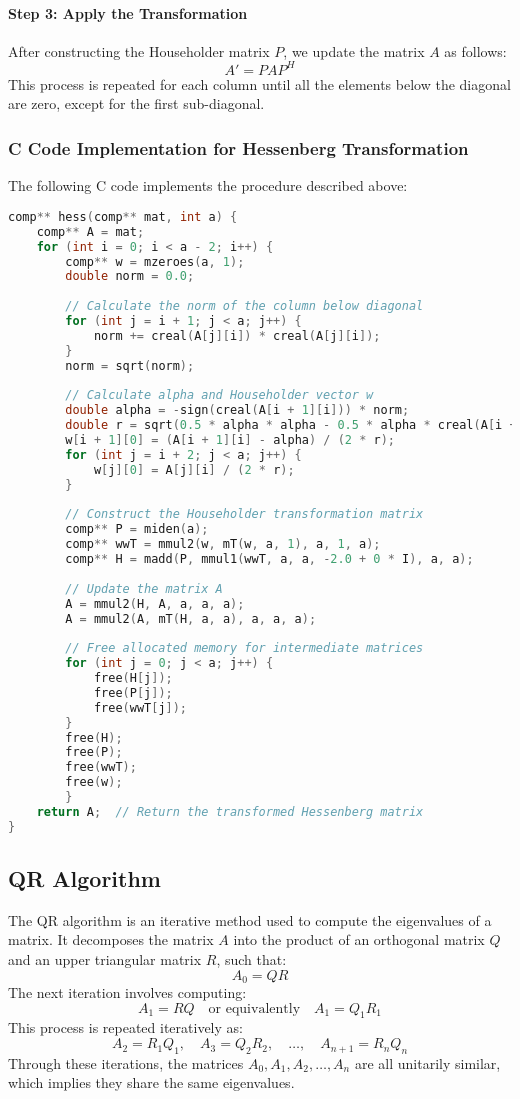 \documentclass[journal,12pt,onecolumn]{IEEEtran}
\theoremstyle{remark}
\begin{document}
\paragraph{Step 3: Apply the Transformation}

After constructing the Householder matrix \( P \), we update the matrix \( A \) as follows:
\[
A' = P A P^H
\]
This process is repeated for each column until all the elements below the diagonal are zero, except for the first sub-diagonal.\\
\newpage

\subsubsection*{C Code Implementation for Hessenberg Transformation}
	
	The following C code implements the procedure described above:
	
\begin{lstlisting}[language=C]
comp** hess(comp** mat, int a) {
	comp** A = mat; 
	for (int i = 0; i < a - 2; i++) {
		comp** w = mzeroes(a, 1);  
		double norm = 0.0;
				
		// Calculate the norm of the column below diagonal
		for (int j = i + 1; j < a; j++) {
			norm += creal(A[j][i]) * creal(A[j][i]);
		}
		norm = sqrt(norm);
				
		// Calculate alpha and Householder vector w
		double alpha = -sign(creal(A[i + 1][i])) * norm;
		double r = sqrt(0.5 * alpha * alpha - 0.5 * alpha * creal(A[i + 1][i]));
		w[i + 1][0] = (A[i + 1][i] - alpha) / (2 * r);
		for (int j = i + 2; j < a; j++) {
			w[j][0] = A[j][i] / (2 * r);
		}
				
		// Construct the Householder transformation matrix
		comp** P = miden(a);
		comp** wwT = mmul2(w, mT(w, a, 1), a, 1, a);
		comp** H = madd(P, mmul1(wwT, a, a, -2.0 + 0 * I), a, a);
				
		// Update the matrix A
		A = mmul2(H, A, a, a, a);
		A = mmul2(A, mT(H, a, a), a, a, a);
				
		// Free allocated memory for intermediate matrices
		for (int j = 0; j < a; j++) {
			free(H[j]);
			free(P[j]);
			free(wwT[j]);
		}
		free(H);
		free(P);
		free(wwT);
		free(w);
		}
	return A;  // Return the transformed Hessenberg matrix
}
\end{lstlisting}
	
\newpage
\subsection{QR Algorithm}
The QR algorithm is an iterative method used to compute the eigenvalues of a matrix. It decomposes the matrix \( A \) into the product of an orthogonal matrix \( Q \) and an upper triangular matrix \( R \), such that:
\[
A_0 = QR
\]
The next iteration involves computing:
\[
A_1 = RQ \quad \text{or equivalently} \quad A_1 = Q_1 R_1
\]
This process is repeated iteratively as:
\[
A_2 = R_1 Q_1, \quad A_3 = Q_2 R_2, \quad \dots, \quad A_{n+1} = R_n Q_n
\]
Through these iterations, the matrices \( A_0, A_1, A_2, \dots, A_n \) are all unitarily similar, which implies they share the same eigenvalues.\\
\end{document}
